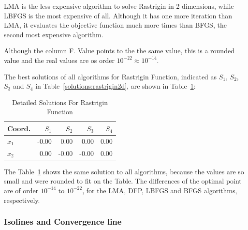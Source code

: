 \documentclass[conference]{IEEEtran}
\begin{document}
LMA is the less expensive algorithm to solve Rastrigin in 2 dimensions, while LBFGS
is the most expensive of all. Although it has one more iteration than LMA, it evaluates
the objective function much more times than BFGS, the second most expensive algorithm.

Although the column F. Value points to the the same value, this is a rounded value
and the real values are os order $10^{-22} \approx 10^{-14}$.

The best solutions of all algorithms for Rastrigin Function, indicated as
$S_{1}$, $S_{2}$, $S_{3}$ and $S_{4}$ in Table~\ref{solutions:rastrigin2d}, are shown
in Table~\ref{detailedsolutions:rastrigin2d}:

\begin{table}[H]
\centering
\caption{Detailed Solutions For Rastrigin Function}
\label{detailedsolutions:rastrigin2d}
\begin{tabular}{lrrrr}
\toprule
 Coord. &  $S_{1}$ &  $S_{2}$ &  $S_{3}$ &  $S_{4}$ \\
\midrule
$x_{1}$ &    -0.00 &     0.00 &     0.00 &     0.00 \\
$x_{2}$ &     0.00 &    -0.00 &    -0.00 &     0.00 \\
\bottomrule
\end{tabular}
\end{table}

The Table~\ref{detailedsolutions:rastrigin2d} shows the same solution to all algorithms, because the values are so small
and were rounded to fit on the Table. The differences of the optimal point are of order $10^{-14}$ to $10^{-22}$,
for the LMA, DFP, LBFGS and BFGS algorithms, respectively.

\subsubsection{Isolines and Convergence line}
\label{isolinesrastrigin2d2D}
\end{document}
